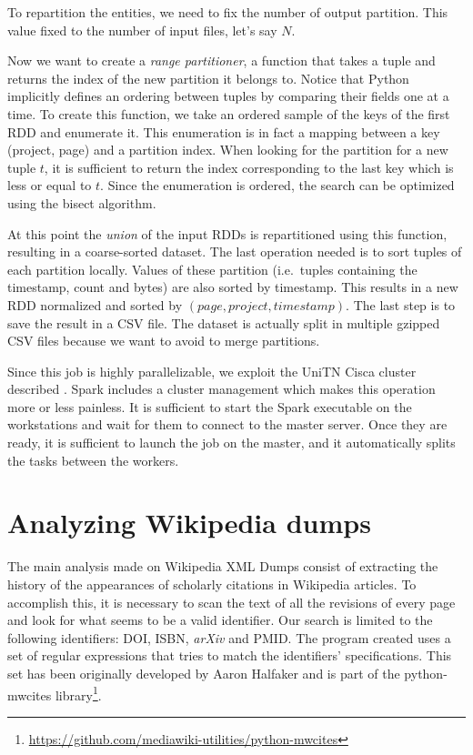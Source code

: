 To repartition the entities, we need to fix the number of output partition.
This value fixed to the number of input files, let's say $N$.

Now we want to create a \emph{range partitioner}, a function that takes a tuple and returns the index of the new partition it belongs to.
Notice that Python implicitly defines an ordering between tuples by comparing their fields one at a time.
To create this function, we take an ordered sample of the keys of the first \ac{RDD} and enumerate it.
This enumeration is in fact a mapping between a key (project, page) and a partition index.
When looking for the partition for a new tuple $t$, it is sufficient to return the index corresponding to the last key which is less or equal to $t$.
Since the enumeration is ordered, the search can be optimized using the bisect algorithm.

At this point the \emph{union} of the input \acp{RDD} is repartitioned using this function, resulting in a coarse-sorted dataset.
The last operation needed is to sort tuples of each partition locally.
Values of these partition (i.e.\ tuples containing the timestamp, count and bytes) are also sorted by timestamp.
This results in a new \ac{RDD} normalized and sorted by $(page, project, timestamp)$.
The last step is to save the result in a CSV file.
The dataset is actually split in multiple gzipped CSV files because we want to avoid to merge partitions.

Since this job is highly parallelizable, we exploit the UniTN Cisca cluster described .
Spark includes a cluster management which makes this operation more or less painless.
It is sufficient to start the Spark executable on the workstations and wait for them to connect to the master server.
Once they are ready, it is sufficient to launch the job on the master, and it automatically splits the tasks between the workers.

\section{Analyzing Wikipedia dumps}
\label{sec:Analyzing Wikipedia dumps}
The main analysis made on Wikipedia XML Dumps consist of extracting the history of the appearances of scholarly citations in Wikipedia articles.
To accomplish this, it is necessary to scan the text of all the revisions of every page and look for what seems to be a valid identifier.
Our search is limited to the following identifiers: \ac{DOI}, \ac{ISBN}, \emph{arXiv} and \ac{PMID}.
The program created uses a set of regular expressions that tries to match the identifiers' specifications.
This set has been originally developed by Aaron Halfaker and is part of the python-mwcites library\footnote{\url{https://github.com/mediawiki-utilities/python-mwcites}}.

